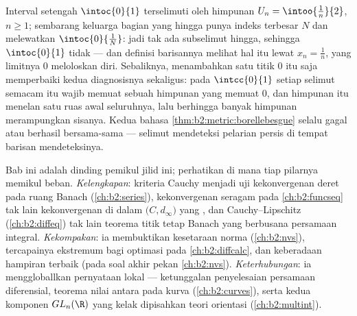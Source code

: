 \begin{example}\label{ex:b2:metric:covers}
Interval setengah  $\intoc{0}{1}$ terselimuti oleh himpunan
 $U_n = \intoo{\frac1n}{2}$, $n \geq 1$; sembarang keluarga bagian
yang hingga punya indeks terbesar $N$ dan melewatkan
$\intoc{0}{\frac1N}$: jadi tak ada subselimut hingga, sehingga
$\intoc{0}{1}$ tidak  --- dan definisi barisannya melihat hal itu
lewat $x_n = \frac1n$, yang limitnya $0$ meloloskan diri. Sebaliknya,
menambahkan satu titik $0$ itu saja memperbaiki kedua diagnosisnya sekaligus:
pada $\intcc{0}{1}$ setiap selimut semacam itu wajib memuat sebuah
himpunan yang memuat $0$, dan himpunan itu menelan satu ruas awal
seluruhnya, lalu berhingga banyak himpunan merampungkan sisanya. Kedua
bahasa \cref{thm:b2:metric:borellebesgue} selalu gagal atau berhasil
bersama-sama --- selimut mendeteksi pelarian persis di tempat barisan mendeteksinya.
\end{example}

\begin{remark}\label{rem:b2:metric:perspectives}
Bab ini adalah dinding pemikul jilid ini; perhatikan di mana
tiap pilarnya memikul beban. \emph{Kelengkapan}: kriteria
Cauchy menjadi uji kekonvergenan deret pada ruang Banach
(\cref{ch:b2:series}), kekonvergenan seragam pada
\cref{ch:b2:funcseq} tak lain kekonvergenan di dalam
$\bigl(C, d_\infty\bigr)$ yang , dan Cauchy--Lipschitz
(\cref{ch:b2:diffeq}) tak lain teorema titik tetap Banach yang
berbusana persamaan integral. \emph{Kekompakan}: ia membuktikan
kesetaraan norma (\cref{ch:b2:nvs}), tercapainya
ekstremum bagi optimasi pada \cref{ch:b2:diffcalc}, dan
keberadaan hampiran terbaik (pada soal akhir pekan
\cref{ch:b2:nvs}). \emph{Keterhubungan}: ia menggloballkan pernyataan
lokal --- ketunggalan penyelesaian persamaan diferensial, teorema
nilai antara pada kurva (\cref{ch:b2:curves}), serta
kedua komponen $GL_n(\R)$ yang kelak dipisahkan teori orientasi
(\cref{ch:b2:multint}).
\end{remark}

